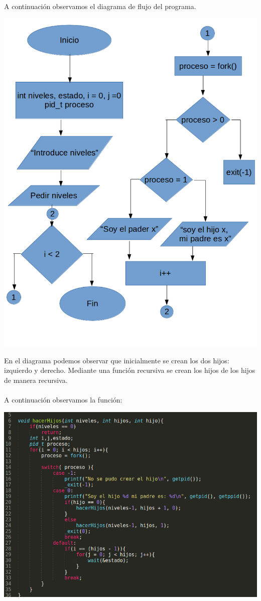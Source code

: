 \documentclass[10pt,a4paper]{article}
\begin{document}
A continuación observamos el diagrama de flujo del programa.

\begin{center}
	\includegraphics[scale=0.3]{diagrama.png} 
\end{center}

En el diagrama podemos observar que inicialmente se crean los dos hijos: izquierdo y derecho. Mediante una función recursiva se crean los hijos de los hijos de manera recursiva.\\\\

A continuación observamos la función:

\begin{center}
	\includegraphics[scale=0.35]{codigo.png} 
\end{center}
\end{document}
